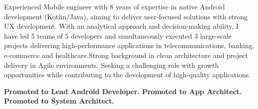 \documentclass[10pt,a4paper,withhyper]{altacv}
\begin{document}


\makecvheader



\begin{paracol}{2}
	

{Experienced Mobile engineer with 8 years of expertise in native Android development (Kotlin/Java), aiming to deliver user-focused solutions with strong UX development. \newline With an analytical approach and decision-making ability, I have led 5 teams of 5 developers and simultaneously executed 3 large-scale projects delivering high-performance applications in telecommunications, banking, e-commerce and healthcare.\newline Strong background in clean architecture and project delivery in Agile environments. Seeking a challenging role with growth opportunities while contributing to the development of high-quality applications.}



\textbf{Promoted to Lead Android Developer.}
\newline
\textbf{Promoted to App Architect.}
\newline
\textbf{Promoted to System Architect.}
\newline


\end{paracol}
\end{document}
